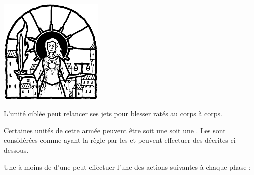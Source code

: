 \begin{multicols}{3}
\vspace*{\fill}
\columnbreak
	
\begin{center}
	\includegraphics[width=5cm]{pics/sunnasblessing.png}
	
	\vspace*{5pt}{\Largerfontsize\antiquefont\volundsblessing{}}
	
	\vspace*{5pt}L'unité ciblée peut relancer ses jets pour blesser ratés au corps à corps.
\end{center}

\vspace*{\fill}
\end{multicols}


Certaines unités de cette armée peuvent être soit une \parentunit{} soit une \supportunit{}. Les \supportunits{} sont considérées comme ayant la règle \insignificant{} par les \parentunits{} et peuvent effectuer des \supportingactions{} décrites ci-dessous. 

\armyspecialruleentry{\supportingactions}

Une \supportunit{} à moins de  d'une \parentunit{} peut effectuer l'une des actions suivantes à chaque phase :

